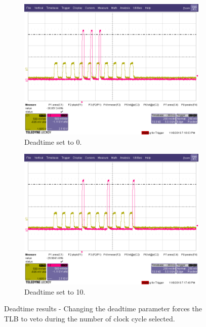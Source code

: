 \begin{figure}[htbp!] 
\centering    
    \begin{subfigure}[t]{.4\textwidth}
    \includegraphics[width=1.0\textwidth]{DeadtimeSet0.png}
    \caption{Deadtime set to 0.}
    \label{fig:Deadtime0}
    \end{subfigure}
    \begin{subfigure}[t]{.4\textwidth}
    \includegraphics[width=1.0\textwidth]{DeadtimeSet10.png}
    \caption{Deadtime set to 10.}
    \label{fig:Deadtime10}
    \end{subfigure}
\caption[Deadtime results oscilloscope]{Deadtime results - Changing the deadtime parameter forces the TLB to veto during the number of clock cycle selected.}
\label{fig:Deadtime}
\end{figure}


